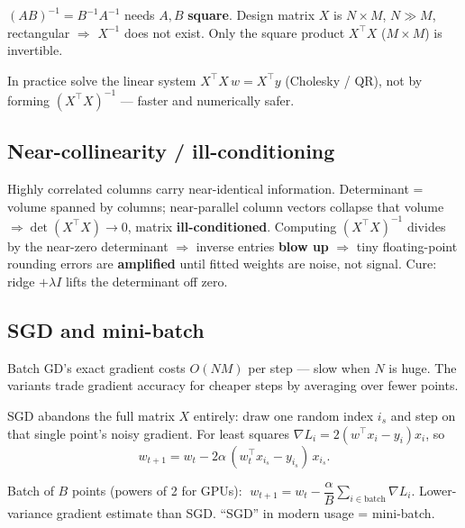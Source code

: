 \documentclass[11pt, a4paper]{article}
\newcommand{\kw}[1]{\textbf{#1}}
\begin{document}
\begin{trapbox}[cannot split $(X^\top X)^{-1}=X^{-1}(X^\top)^{-1}$]
$(AB)^{-1}=B^{-1}A^{-1}$ needs $A,B$ \kw{square}. Design matrix $X$ is $N\times M$, $N\gg M$,
rectangular $\Rightarrow$ $X^{-1}$ does not exist. Only the square product $X^\top X$ ($M\times M$)
is invertible.
\end{trapbox}

\begin{pitfallbox}
In practice solve the linear system $X^\top X\,w=X^\top y$ (Cholesky / QR), not by forming
$(X^\top X)^{-1}$ — faster and numerically safer.
\end{pitfallbox}

\subsection{Near-collinearity / ill-conditioning}

Highly correlated columns carry near-identical information. Determinant = volume spanned by columns;
near-parallel column vectors collapse that volume $\Rightarrow\det(X^\top X)\to0$, matrix
\kw{ill-conditioned}. Computing $(X^\top X)^{-1}$ divides by the near-zero determinant $\Rightarrow$
inverse entries \kw{blow up} $\Rightarrow$ tiny floating-point rounding errors are \kw{amplified}
until fitted weights are noise, not signal. Cure: ridge $+\lambda I$ lifts the determinant off zero.

\subsection{SGD and mini-batch}

Batch GD's exact gradient costs $O(NM)$ per step — slow when $N$ is huge. The variants trade
gradient accuracy for cheaper steps by averaging over fewer points.

\begin{defbox}
SGD abandons the full matrix $X$ entirely: draw one random index $i_s$ and step on that single
point's noisy gradient. For least squares $\nabla L_i=2(w^\top x_i-y_i)x_i$, so
\[
w_{t+1}=w_t-2\alpha\,(w_t^\top x_{i_s}-y_{i_s})\,x_{i_s}.
\]
\end{defbox}

\begin{defbox}
Batch of $B$ points (powers of 2 for GPUs): $\;w_{t+1}=w_t-\dfrac{\alpha}{B}\sum_{i\in\text{batch}}\nabla L_i$.
Lower-variance gradient estimate than SGD. ``SGD'' in modern usage = mini-batch.
\end{defbox}
\end{document}
